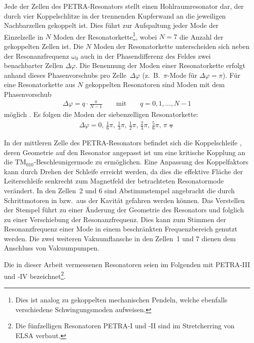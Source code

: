 Jede der Zellen des PETRA-Resonators stellt einen Hohlraumresonator dar, der durch vier Koppelschlitze in der trennenden Kupferwand an die jeweiligen Nachbarzellen gekoppelt ist.
Dies führt zur Aufspaltung jeder Mode der Einzelzelle in $N$ Moden der Resonatorkette\footnote{Dies ist analog zu gekoppelten mechanischen Pendeln, welche ebenfalls verschiedene Schwingungsmoden aufweisen.}, wobei $N = 7$ die Anzahl der gekoppelten Zellen ist.
Die $N$ Moden der Resonatorkette unterscheiden sich neben der Resonanzfrequenz $\omega_0$ auch in der Phasendifferenz des Feldes zwei benachbarter Zellen  $\Delta \varphi$.
Die Benennung der Moden einer Resonatorkette erfolgt anhand dieses Phasenvorschubs pro Zelle~$\Delta \varphi$ (z.\ B.\ $\pi$-Mode für $\Delta \varphi = \pi$).
Für eine Resonatorkette aus $N$ gekoppelten Resonatoren sind Moden mit dem Phasenvorschub
\begin{align}
	\Delta \varphi = q \cdot \frac{\pi}{N-1} \qquad \text{mit} \qquad q = 0, 1, \dots, N-1
\end{align}
möglich \cite[S.\ 110]{wangler}.
Es folgen die Moden der siebenzelligen Resonatorkette:
\begin{align}
  \Delta \varphi = 0,\, \frac{1}{6} \pi,\, \frac{1}{3} \pi,\, \frac{1}{2} \pi,\, \frac{2}{3} \pi,\, \frac{5}{6} \pi,\, \pi \eqdot
\end{align}

In der mittleren Zelle des PETRA-Resonators befindet sich die Koppelschleife \cite{desy_schleife}, deren Geometrie auf den Resonator angepasst ist um eine kritische Kopplung an die $\mathrm{TM}_{010}$-Beschleuniger\-mode zu ermöglichen.
Eine Anpassung des Koppelfaktors kann durch Drehen der Schleife erreicht werden, da dies die effektive Fläche der Leiterschleife senkrecht zum Magnetfeld der betrachteten Resonatormode verändert.
In den Zellen~2 und 6 sind Abstimmstempel \cite{desy_stempel} angebracht die durch Schrittmotoren in bzw.\ aus der Kavität gefahren werden können.
Das Verstellen der Stempel führt zu einer Änderung der Geometrie des Resonators und folglich zu einer Verschiebung der Resonanzfrequenz.
Dies kann zum Stimmen der Resonanzfrequenz einer Mode in einem beschränkten Frequenzbereich genutzt werden.
Die zwei weiteren Vakuumflansche in den Zellen~1 und 7 dienen dem Anschluss von Vakuumpumpen.

Die in dieser Arbeit vermessenen Resonatoren seien im Folgenden mit PETRA-III und -IV bezeichnet\footnote{Die fünfzelligen Resonatoren PETRA-I und -II sind im Stretcherring von ELSA verbaut.}.



